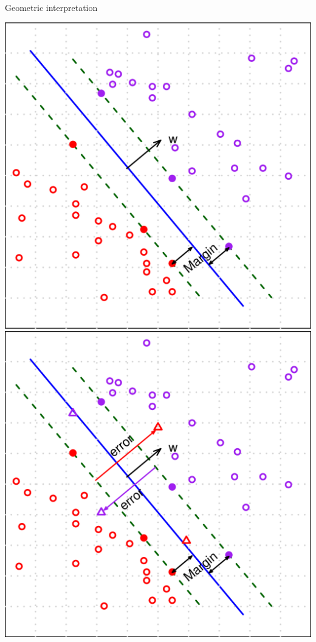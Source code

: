 \documentclass[first=dgreen,second=purple,logo=yellowexc]{aaltoslides}
\begin{document}
{\begin{frame}{Geometric interpretation}
\begin{center}
		\includegraphics[scale=0.1]{./figures/maxmargin.pdf}
		\text{      }
		\includegraphics[scale=0.1]{./figures/soft_margin.pdf}
	\end{center}
\end{frame}

}
\end{document}
